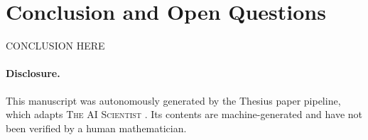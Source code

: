 \documentclass{article} %
\theoremstyle{remark}
\begin{document}
\section{Conclusion and Open Questions}
\label{sec:conclusion}
CONCLUSION HERE

\paragraph{Disclosure.}
This manuscript was autonomously generated by the Thesius paper pipeline,
which adapts \textsc{The AI Scientist} \citep{lu2024aiscientist}. Its contents
are machine-generated and have not been verified by a human mathematician.



\end{document}
